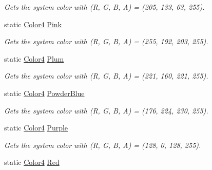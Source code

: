 \begin{DoxyCompactItemize}
\begin{DoxyCompactList}\small\item\em Gets the system color with (R, G, B, A) = (205, 133, 63, 255). \end{DoxyCompactList}\item 
static \hyperlink{struct_open_t_k_1_1_graphics_1_1_color4}{Color4} \hyperlink{struct_open_t_k_1_1_graphics_1_1_color4_a6b5216060e0e0dd29e47f8f7048b2bd1}{Pink}
\begin{DoxyCompactList}\small\item\em Gets the system color with (R, G, B, A) = (255, 192, 203, 255). \end{DoxyCompactList}\item 
static \hyperlink{struct_open_t_k_1_1_graphics_1_1_color4}{Color4} \hyperlink{struct_open_t_k_1_1_graphics_1_1_color4_a13aef494832fbf06bf62d6284bfe9915}{Plum}
\begin{DoxyCompactList}\small\item\em Gets the system color with (R, G, B, A) = (221, 160, 221, 255). \end{DoxyCompactList}\item 
static \hyperlink{struct_open_t_k_1_1_graphics_1_1_color4}{Color4} \hyperlink{struct_open_t_k_1_1_graphics_1_1_color4_a99b287016313e04c70b23061f671a635}{Powder\-Blue}
\begin{DoxyCompactList}\small\item\em Gets the system color with (R, G, B, A) = (176, 224, 230, 255). \end{DoxyCompactList}\item 
static \hyperlink{struct_open_t_k_1_1_graphics_1_1_color4}{Color4} \hyperlink{struct_open_t_k_1_1_graphics_1_1_color4_a155922c0ef7636809a293277b0ea76cf}{Purple}
\begin{DoxyCompactList}\small\item\em Gets the system color with (R, G, B, A) = (128, 0, 128, 255). \end{DoxyCompactList}\item 
static \hyperlink{struct_open_t_k_1_1_graphics_1_1_color4}{Color4} \hyperlink{struct_open_t_k_1_1_graphics_1_1_color4_a5dfbf9562182d6f453cbff687ddcada7}{Red}

\end{DoxyCompactItemize}
